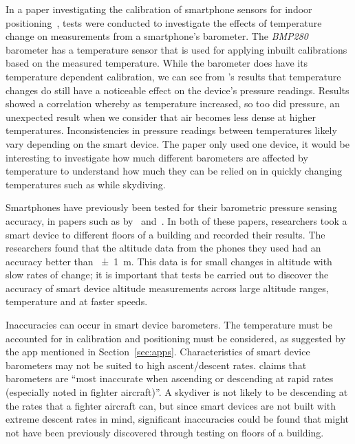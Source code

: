\documentclass[11pt, a4paper, twocolumn]{article}
\begin{document}
In a paper investigating the calibration of smartphone sensors for indoor positioning~\cite{keller_calibration_2012}, tests were conducted to investigate the effects of temperature change on measurements from a smartphone's barometer. The \textit{BMP280} barometer has a temperature sensor that is used for applying inbuilt calibrations based on the measured temperature. While the barometer does have its temperature dependent calibration, we can see from \citeauthor{keller_calibration_2012}'s results that temperature changes do still have a noticeable effect on the device's pressure readings. Results showed a correlation whereby as temperature increased, so too did pressure, an unexpected result when we consider that air becomes less dense at higher temperatures. Inconsistencies in pressure readings between temperatures likely vary depending on the smart device. The paper only used one device, it would be interesting to investigate how much different barometers are affected by temperature to understand how much they can be relied on in quickly changing temperatures such as while skydiving.

Smartphones have previously been tested for their barometric pressure sensing accuracy, in papers such as by~\textcite{keller_calibration_2012} and~\textcite{he_atmospheric_2012}. In both of these papers, researchers took a smart device to different floors of a building and recorded their results. The researchers found that the altitude data from the phones they used had an accuracy better than \SI{\pm1}{\metre}. This data is for small changes in altitude with slow rates of change; it is important that tests be carried out to discover the accuracy of smart device altitude measurements across large altitude ranges, temperature and at faster speeds.

Inaccuracies can occur in smart device barometers. The temperature must be accounted for in calibration and positioning must be considered, as suggested by the  app mentioned in Section~\ref{sec:apps}. Characteristics of smart device barometers may not be suited to high ascent/descent rates. \textcite{gray_integrated_1995} claims that barometers are ``most inaccurate when ascending or descending at rapid rates (especially noted in fighter aircraft)''. A skydiver is not likely to be descending at the rates that a fighter aircraft can, but since smart devices are not built with extreme descent rates in mind, significant inaccuracies could be found that might not have been previously discovered through testing on floors of a building.
\end{document}
